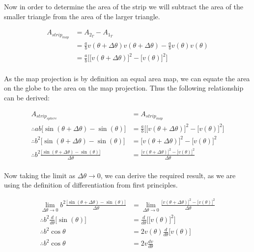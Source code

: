 \documentclass[a4paper]{article}
\begin{document}
\begin{enumerate}[label=(\alph*)]
	Now in order to determine the area of the strip we will subtract the area of the smaller triangle from the area of the larger triangle.

	\begin{align*}
	A_{strip_{map}} & = A_{2_T} - A_{1_T}\\
	& = \frac{a}{b}v(\theta + \Delta \theta)v(\theta + \Delta \theta) - \frac{a}{b}v(\theta)v(\theta)\\
	& = \frac{a}{b}\bigg[\Big[{v(\theta + \Delta \theta)\Big]^2} - \Big[{v(\theta)}\Big]^2\bigg]\\
	\end{align*}

	As the map projection is by definition an equal area map, we can equate the area on the globe to the area on the map projection. Thus the following relationship can be derived:

	\begin{align*}
	A_{strip_{sphere}} & = A_{strip_{map}}\\
	\therefore ab \Big[\sin(\theta + \Delta \theta) - \sin(\theta)\Big] & = \frac{a}{b}\bigg[\Big[{v(\theta + \Delta \theta)\Big]^2} - \Big[{v(\theta)}\Big]^2\bigg]\\
	\therefore b^2\Big[\sin(\theta + \Delta \theta) - \sin(\theta)\Big] & = \Big[{v(\theta + \Delta \theta)\Big]^2} - \Big[{v(\theta)}\Big]^2\\
	\therefore b^2\frac{\Big[\sin(\theta + \Delta \theta) - \sin(\theta)\Big]}{\Delta \theta} & = \frac{\Big[{v(\theta + \Delta \theta)\Big]^2} - \Big[{v(\theta)}\Big]^2}{\Delta \theta}\\
	\end{align*}

	Now taking the limit as $\Delta \theta \to 0$, we can derive the required result, as we are using the definition of differentiation from first principles.

	\begin{align*}
	\lim_{{\Delta \theta}\to 0} b^2\frac{\Big[\sin(\theta + \Delta \theta) - \sin(\theta)\Big]}{\Delta \theta} & = \lim_{{\Delta \theta}\to 0} \frac{\Big[{v(\theta + \Delta \theta)\Big]^2} - \Big[{v(\theta)}\Big]^2}{\Delta \theta}\\
	\therefore b^2\frac{d}{d\theta}\Big[\sin(\theta)\Big] & = \frac{d}{d\theta}\bigg[\Big[v(\theta)\Big]^2\bigg]\\
	\therefore b^2{\cos \theta} & = 2v(\theta)\frac{d}{d\theta}\Big[v(\theta)\Big]\\
	\therefore b^2{\cos \theta} & = 2v\frac{dv}{d\theta}\\
	\end{align*}


\end{enumerate}
\end{document}
